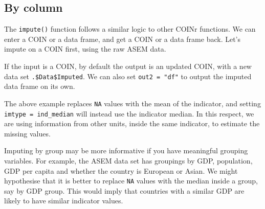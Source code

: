 \documentclass[
]{book}
\newenvironment{Shaded}{\begin{snugshade}}{\end{snugshade}}
\newcommand{\CommentTok}[1]{\textcolor[rgb]{0.56,0.35,0.01}{\textit{#1}}}
\newcommand{\DataTypeTok}[1]{\textcolor[rgb]{0.13,0.29,0.53}{#1}}
\newcommand{\KeywordTok}[1]{\textcolor[rgb]{0.13,0.29,0.53}{\textbf{#1}}}
\newcommand{\NormalTok}[1]{#1}
\newcommand{\OperatorTok}[1]{\textcolor[rgb]{0.81,0.36,0.00}{\textbf{#1}}}
\newcommand{\StringTok}[1]{\textcolor[rgb]{0.31,0.60,0.02}{#1}}
\begin{document}
\hypertarget{by-column}{%
\subsection{By column}\label{by-column}}

The \texttt{impute()} function follows a similar logic to other COINr functions. We can enter a COIN or a data frame, and get a COIN or a data frame back. Let's impute on a COIN first, using the raw ASEM data.

\begin{Shaded}
\end{Shaded}

If the input is a COIN, by default the output is an updated COIN, with a new data set \texttt{.\$Data\$Imputed}. We can also set \texttt{out2\ =\ "df"} to output the imputed data frame on its own.

The above example replaces \texttt{NA} values with the mean of the indicator, and setting \texttt{imtype\ =\ ind\_median} will instead use the indicator median. In this respect, we are using information from other units, inside the same indicator, to estimate the missing values.

Imputing by group may be more informative if you have meaningful grouping variables. For example, the ASEM data set has groupings by GDP, population, GDP per capita and whether the country is European or Asian. We might hypothesise that it is better to replace \texttt{NA} values with the median inside a group, say by GDP group. This would imply that countries with a similar GDP are likely to have similar indicator values.
\end{document}
